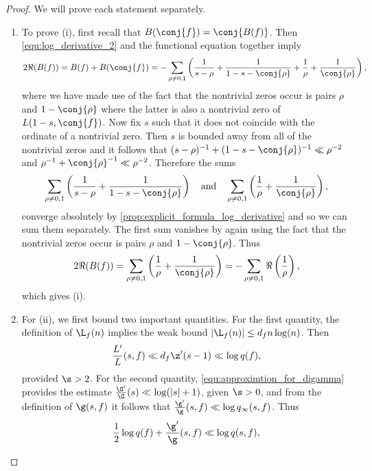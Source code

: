     \begin{proof}
      We will prove each statement separately.
      \begin{enumerate}[label=(\roman*)]
        \item To prove (i), first recall that  $B(\conj{f}) = \conj{B(f)}$. Then \cref{equ:log_derivative_2} and the functional equation together imply
        \[
          2\Re(B(f)) = B(f)+B(\conj{f}) = -\sum_{\rho \neq 0,1}\left(\frac{1}{s-\rho}+\frac{1}{1-s-\conj{\rho}}+\frac{1}{\rho}+\frac{1}{\conj{\rho}}\right),
        \]
        where we have made use of the fact that the nontrivial zeros occur is pairs $\rho$ and $1-\conj{\rho}$ where the latter is also a nontrivial zero of $L(1-s,\conj{f})$. Now fix $s$ such that it does not coincide with the ordinate of a nontrivial zero. Then $s$ is bounded away from all of the nontrivial zeros and it follows that $(s-\rho)^{-1}+(1-s-\conj{\rho})^{-1} \ll \rho^{-2}$ and $\rho^{-1}+\conj{\rho}^{-1} \ll \rho^{-2}$. Therefore the sums
        \[
          \sum_{\rho \neq 0,1}\left(\frac{1}{s-\rho}+\frac{1}{1-s-\conj{\rho}}\right) \quad \text{and} \quad \sum_{\rho \neq 0,1}\left(\frac{1}{\rho}+\frac{1}{\conj{\rho}}\right),
        \]
        converge absolutely by \cref{prop:explicit_formula_log_derivative} and so we can sum them separately. The first sum vanishes by again using the fact that the nontrivial zeros occur is pairs $\rho$ and $1-\conj{\rho}$. Thus
        \[
          2\Re(B(f)) = \sum_{\rho \neq 0,1}\left(\frac{1}{\rho}+\frac{1}{\conj{\rho}}\right) = -\sum_{\rho \neq 0,1}\Re\left(\frac{1}{\rho}\right),
        \]
        which gives (i).
      \item For (ii), we first bound two important quantities. For the first quantity, the definition of $\L_{f}(n)$ implies the weak bound $|\L_{f}(n)| \le d_{f}n\log(n)$. Then
      \begin{equation}\label{equ:log_derivative_bound_conductor}
        \frac{L'}{L}(s,f) \ll d_{f}\z'(s-1) \ll \log{q(f)},
      \end{equation}
      provided $\s > 2$. For the second quantity, \cref{equ:approximtion_for_digamma} provides the estimate $\frac{\G'}{\G}(s) \ll \log(|s|+1)$, given $\s > 0$, and from the definition of $\g(s,f)$ it follows that $\frac{\g'}{\g}(s,f) \ll \log{q_{\infty}(s,f)}$. Thus
      \begin{equation}\label{equ:log_conductor_gamma_factor_bound_analytic_conductor}
        \frac{1}{2}\log{q(f)}+\frac{\g'}{\g}(s,f) \ll \log{q(s,f)},
      \end{equation}

\end{enumerate}
\end{proof}
